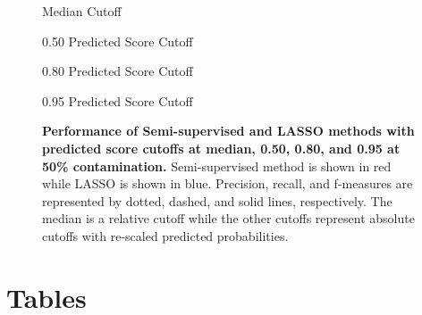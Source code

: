 \documentclass{bmcart}
\def\texttt{[image: ]}
\begin{document}
\begin{backmatter}
\begin{figure}[ht]
    \centering
        \caption{Median Cutoff}
        \caption{0.50 Predicted Score Cutoff}
        \caption{0.80 Predicted Score Cutoff}
        \caption{0.95 Predicted Score Cutoff}
    \vspace{1cm}
    \caption{\textbf{Performance of Semi-supervised and LASSO methods with predicted score cutoffs at median, 0.50, 0.80, and 0.95 at 50\% contamination.} Semi-supervised method is shown in red while LASSO is shown in blue. Precision, recall, and f-measures are represented by dotted, dashed, and solid lines, respectively. The median is a relative cutoff while the other cutoffs represent absolute cutoffs with re-scaled predicted probabilities.}
    \label{fig:perf50}
\end{figure}


\section*{Tables}


\end{backmatter}
\end{document}
